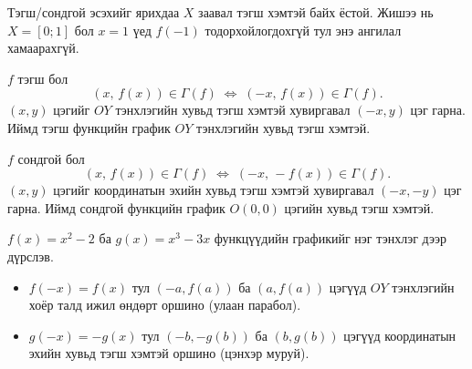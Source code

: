 \begin{remark}
Тэгш/сондгой эсэхийг ярихдаа $X$ заавал тэгш хэмтэй байх ёстой. Жишээ нь
$X=[0;1]$ бол $x=1$ үед $f(-1)$ тодорхойлогдохгүй тул энэ ангилал хамаарахгүй.
\end{remark}

\begin{remark}
$f$ тэгш бол
\[
  (x,\,f(x))\in\Gamma(f) \;\Longleftrightarrow\; (-x,\,f(x))\in\Gamma(f).
\]
$(x,y)$ цэгийг $OY$ тэнхлэгийн хувьд тэгш хэмтэй хувиргавал $(-x,y)$ цэг гарна.
Иймд тэгш функцийн график $OY$ тэнхлэгийн хувьд тэгш хэмтэй.

$f$ сондгой бол
\[
  (x,\,f(x))\in\Gamma(f) \;\Longleftrightarrow\; (-x,\,-f(x))\in\Gamma(f).
\]
$(x,y)$ цэгийг координатын эхийн хувьд тэгш хэмтэй хувиргавал $(-x,-y)$ цэг гарна.
Иймд сондгой функцийн график $O(0,0)$ цэгийн хувьд тэгш хэмтэй.
\end{remark}

\begin{example}
$f(x)=x^2-2$ ба $g(x)=x^3-3x$ функцүүдийн графикийг нэг тэнхлэг дээр дүрслэв.
\begin{itemize}
  \item $f(-x)=f(x)$ тул $(-a,f(a))$ ба $(a,f(a))$ цэгүүд $OY$ тэнхлэгийн хоёр талд
        ижил өндөрт оршино (улаан парабол).
  \item $g(-x)=-g(x)$ тул $(-b,-g(b))$ ба $(b,g(b))$ цэгүүд координатын эхийн хувьд
        тэгш хэмтэй оршино (цэнхэр муруй).
\end{itemize}
\begin{center}
\end{center}
\end{example}


